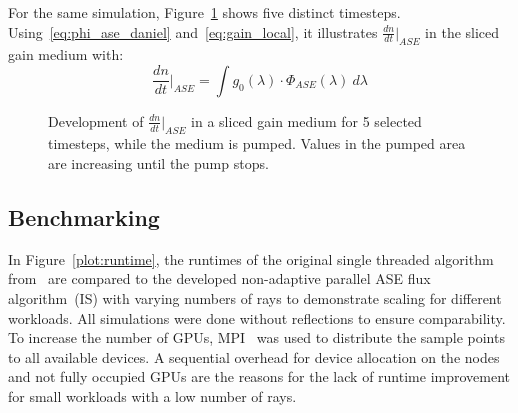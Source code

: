 For the same simulation, Figure~\ref{graphic:benchmark_4_timeslices}
shows five distinct timesteps.  Using~\eqref{eq:phi_ase_daniel}
and~\eqref{eq:gain_local}, it illustrates ${\frac{dn}{dt}|}_{ASE}$ in
the sliced gain medium with:
\begin{equation}
  \label{eq:dndt}
  \frac{dn}{dt}\bigg|_{ASE} = \int g_0(\lambda) \cdot \Phi_{ASE}(\lambda)~d\lambda
\end{equation}
\begin{figure}[H]
  \centerline{
    }
  \caption{Development of ${\frac{dn}{dt}|}_{ASE}$ in a sliced gain
    medium for 5 selected timesteps, while the medium is
    pumped. Values in the pumped area are increasing until the pump
    stops.}
\label{graphic:benchmark_4_timeslices}
\end{figure}

\subsection{Benchmarking}
\label{subsec:benchmarking}
In Figure~\ref{plot:runtime}, the runtimes of the original single
threaded algorithm from~\cite{ASE2010} are compared to the developed
non-adaptive parallel ASE flux algorithm~(IS) with varying numbers of
rays to demonstrate scaling for different workloads. All simulations
were done without reflections to ensure comparability. To increase the
number of GPUs, MPI~\cite{MPI} was used to distribute the sample
points to all available devices. A sequential overhead for device
allocation on the nodes and not fully occupied GPUs are the reasons
for the lack of runtime improvement for small workloads with a low
number of rays.

